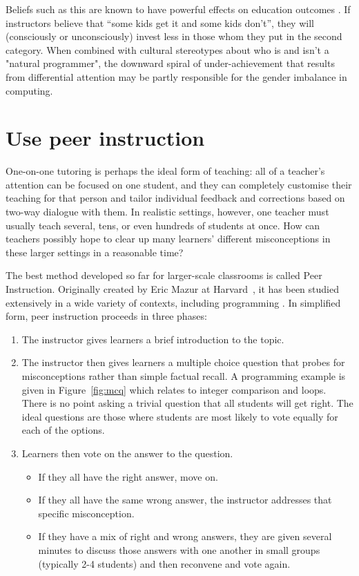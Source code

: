 \documentclass[10pt,letterpaper]{article}
\newcommand{\rulemajor}[2]{\section{#1}\label{#2}}
\begin{document}
Beliefs such as this are known to have powerful effects on education outcomes
\cite{alvidrez-weinstein,brophy,jussim-eccles}.
If instructors believe that ``some kids get it and some kids don't'',
they will (consciously or unconsciously) invest less in those whom they put in the second category.
When combined with cultural stereotypes about who is and isn't a "natural programmer",
the downward spiral of under-achievement that results from differential attention
may be partly responsible for the gender imbalance in computing.

\rulemajor{Use peer instruction}{peer-instruction}

One-on-one tutoring is perhaps the ideal form of teaching:
all of a teacher's attention can be focused on one student,
and they can completely customise their teaching for that person
and tailor individual feedback and corrections based on two-way dialogue with them.
In realistic settings,
however,
one teacher must usually teach several, tens, or even hundreds of students at once.
How can teachers possibly hope to clear up many learners' different misconceptions
in these larger settings in a reasonable time?

The best method developed so far for larger-scale classrooms is called Peer Instruction.
Originally created by Eric Mazur at Harvard~\cite{mazur-peer-instruction},
it has been studied extensively in a wide variety of contexts,
including programming \cite{porter-multi,porter-success}.
In simplified form,
peer instruction proceeds in three phases:

\begin{enumerate}

\item The instructor gives learners a brief introduction to the topic.

\item The instructor then gives learners a multiple choice question
  that probes for misconceptions rather than simple factual recall.
  A programming example is given in Figure~\ref{fig:mcq}
  which relates to integer comparison and loops.
  There is no point asking a trivial question that all students will get right.
  The ideal questions are those where students are most likely to vote equally for each of the options.

\item Learners then vote on the answer to the question.

  \begin{itemize}
  \item If they all have the right answer, move on.
  \item If they all have the same wrong answer,
    the instructor addresses that specific misconception.
  \item If they have a mix of right and wrong answers,
    they are given several minutes to discuss those answers with one another
    in small groups (typically 2-4 students)
    and then reconvene and vote again.
  \end{itemize}

\end{enumerate}
\end{document}
